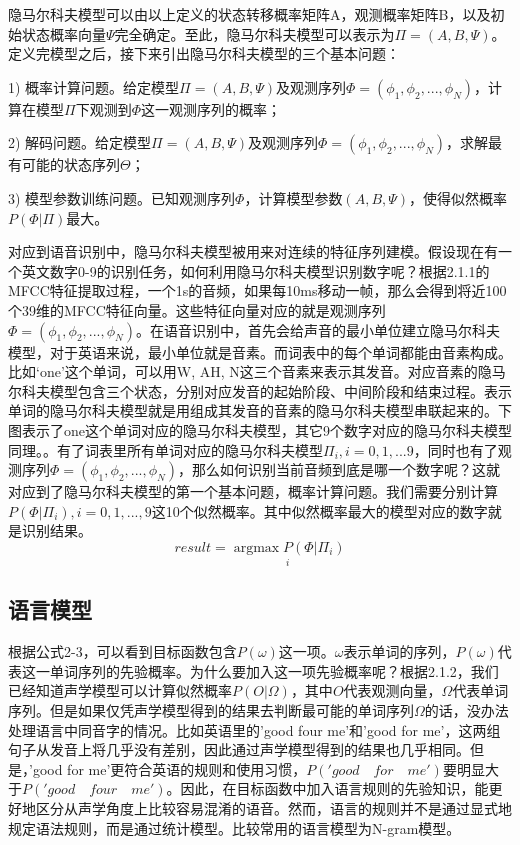 隐马尔科夫模型可以由以上定义的状态转移概率矩阵A，观测概率矩阵B，以及初始状态概率向量$\Psi$完全确定。至此，隐马尔科夫模型可以表示为$\Pi=(A,B,\Psi)$。定义完模型之后，接下来引出隐马尔科夫模型的三个基本问题：

1) 概率计算问题。给定模型$\Pi=(A,B,\Psi)$及观测序列$\Phi=(\phi_1,\phi_2,...,\phi_N)$，计算在模型$\Pi$下观测到$\Phi$这一观测序列的概率；

2) 解码问题。给定模型$\Pi=(A,B,\Psi)$及观测序列$\Phi=(\phi_1,\phi_2,...,\phi_N)$，求解最有可能的状态序列$\Theta$；

3) 模型参数训练问题。已知观测序列$\Phi$，计算模型参数$(A,B,\Psi)$，使得似然概率$P(\Phi|\Pi)$最大。

对应到语音识别中，隐马尔科夫模型被用来对连续的特征序列建模。假设现在有一个英文数字0-9的识别任务，如何利用隐马尔科夫模型识别数字呢？根据2.1.1的MFCC特征提取过程，一个1s的音频，如果每10ms移动一帧，那么会得到将近100个39维的MFCC特征向量。这些特征向量对应的就是观测序列$\Phi=(\phi_1,\phi_2,...,\phi_N)$。在语音识别中，首先会给声音的最小单位建立隐马尔科夫模型，对于英语来说，最小单位就是音素。而词表中的每个单词都能由音素构成。比如‘one’这个单词，可以用W, AH, N这三个音素来表示其发音。对应音素的隐马尔科夫模型包含三个状态，分别对应发音的起始阶段、中间阶段和结束过程。表示单词的隐马尔科夫模型就是用组成其发音的音素的隐马尔科夫模型串联起来的。下图表示了one这个单词对应的隐马尔科夫模型，其它9个数字对应的隐马尔科夫模型同理。{\color{red}{\large 插入隐马尔科夫模型图片}}。有了词表里所有单词对应的隐马尔科夫模型$\Pi_i,i=0,1,...9$，同时也有了观测序列$\Phi=(\phi_1,\phi_2,...,\phi_N)$，那么如何识别当前音频到底是哪一个数字呢？这就对应到了隐马尔科夫模型的第一个基本问题，概率计算问题。我们需要分别计算$P(\Phi|\Pi_i), i=0,1,...,9$这10个似然概率。其中似然概率最大的模型对应的数字就是识别结果。\begin{equation}result=\underset{i}{\operatorname{argmax} P(\Phi|\Pi_i)} \end{equation}
\subsection{语言模型}
根据公式2-3，可以看到目标函数包含$P(\omega)$这一项。$\omega$表示单词的序列，$P(\omega)$代表这一单词序列的先验概率。为什么要加入这一项先验概率呢？根据2.1.2，我们已经知道声学模型可以计算似然概率$P(O|\Omega)$，其中$O$代表观测向量，$\Omega$代表单词序列。但是如果仅凭声学模型得到的结果去判断最可能的单词序列$\Omega$的话，没办法处理语言中同音字的情况。比如英语里的'good four me'和'good for me'，这两组句子从发音上将几乎没有差别，因此通过声学模型得到的结果也几乎相同。但是，'good for me'更符合英语的规则和使用习惯，$P('good\quad for\quad me')$要明显大于$P('good\quad four\quad me')$。因此，在目标函数中加入语言规则的先验知识，能更好地区分从声学角度上比较容易混淆的语音。然而，语言的规则并不是通过显式地规定语法规则，而是通过统计模型。比较常用的语言模型为N-gram模型。
